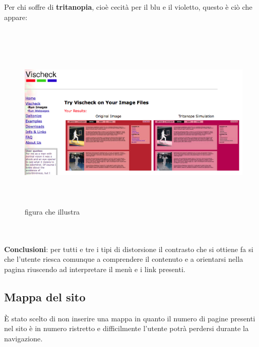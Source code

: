 	\\
	\\ Per chi soffre di \textbf{tritanopia}, cio\`e cecit\`a per il blu e il violetto, questo \`e ci\`o che appare:
	\\
	\\ 
	\begin{figure}
		\centering
		\includegraphics[width=150mm, height=85mm]{images/contrasto_pagina_tritanope.png}
		\caption{figura che illustra}
	\end{figure}
	\\
	\\ \textbf{Conclusioni}: per tutti e tre i tipi di distorsione il contrasto che si ottiene fa si che l'utente riesca comunque a comprendere il contenuto e a orientarsi nella pagina riuscendo ad interpretare il men\`u e i link presenti.

\subsection{Mappa del sito}
\`E stato scelto di non inserire una mappa in quanto il numero di pagine presenti nel sito \`e in numero ristretto e difficilmente l'utente potr\`a perdersi durante la navigazione.